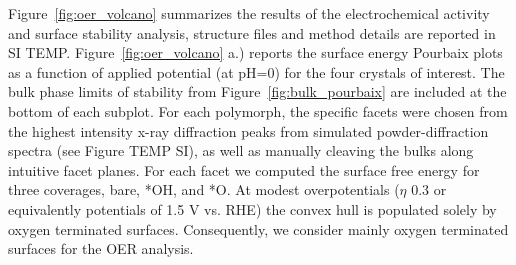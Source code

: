 Figure~\ref{fig:oer_volcano} summarizes the results of the electrochemical activity and surface stability analysis, structure files and method details are reported in SI TEMP.
%
Figure~\ref{fig:oer_volcano} a.) reports the surface energy Pourbaix plots as a function of applied potential (at pH\num{=0}) for the four \IrOx crystals of interest.
%
The bulk phase limits of stability from Figure~\ref{fig:bulk_pourbaix} are included at the bottom of each subplot.
%
For each polymorph, the specific facets were chosen from the highest intensity x-ray diffraction peaks from simulated powder-diffraction spectra\cite{Momma2011} (see Figure TEMP SI),
as well as manually cleaving the bulks along intuitive facet planes.
%
For each facet we computed the surface free energy for three coverages, bare, *OH, and *O.
%
%
At modest overpotentials ($\eta$ \mytilde\num{0.3} or equivalently potentials of \mytilde\num{1.5} V vs. RHE) the convex hull is populated solely by oxygen terminated surfaces.
%
Consequently, we consider mainly oxygen terminated surfaces for the OER analysis.


